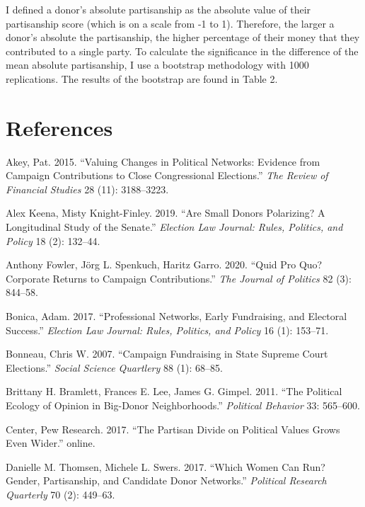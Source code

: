 \documentclass[11pt,]{article}
\begin{document}
I defined a donor's absolute partisanship as the absolute value of their
partisanship score (which is on a scale from -1 to 1). Therefore, the
larger a donor's absolute the partisanship, the higher percentage of
their money that they contributed to a single party. To calculate the
significance in the difference of the mean absolute partisanship, I use
a bootstrap methodology with 1000 replications. The results of the
bootstrap are found in Table 2.

\hypertarget{references}{%
\section*{References}\label{references}}

\hypertarget{refs}{}
\leavevmode\hypertarget{ref-akey2015}{}%
Akey, Pat. 2015. ``Valuing Changes in Political Networks: Evidence from
Campaign Contributions to Close Congressional Elections.'' \emph{The
Review of Financial Studies} 28 (11): 3188--3223.

\leavevmode\hypertarget{ref-keena2019}{}%
Alex Keena, Misty Knight-Finley. 2019. ``Are Small Donors Polarizing? A
Longitudinal Study of the Senate.'' \emph{Election Law Journal: Rules,
Politics, and Policy} 18 (2): 132--44.

\leavevmode\hypertarget{ref-garro2020}{}%
Anthony Fowler, Jörg L. Spenkuch, Haritz Garro. 2020. ``Quid Pro Quo?
Corporate Returns to Campaign Contributions.'' \emph{The Journal of
Politics} 82 (3): 844--58.

\leavevmode\hypertarget{ref-bonica2017}{}%
Bonica, Adam. 2017. ``Professional Networks, Early Fundraising, and
Electoral Success.'' \emph{Election Law Journal: Rules, Politics, and
Policy} 16 (1): 153--71.

\leavevmode\hypertarget{ref-bonneau2007}{}%
Bonneau, Chris W. 2007. ``Campaign Fundraising in State Supreme Court
Elections.'' \emph{Social Science Quartlery} 88 (1): 68--85.

\leavevmode\hypertarget{ref-bramlett2011}{}%
Brittany H. Bramlett, Frances E. Lee, James G. Gimpel. 2011. ``The
Political Ecology of Opinion in Big-Donor Neighborhoods.''
\emph{Political Behavior} 33: 565--600.

\leavevmode\hypertarget{ref-pew2017}{}%
Center, Pew Research. 2017. ``The Partisan Divide on Political Values
Grows Even Wider.'' online.

\leavevmode\hypertarget{ref-thomsen2017}{}%
Danielle M. Thomsen, Michele L. Swers. 2017. ``Which Women Can Run?
Gender, Partisanship, and Candidate Donor Networks.'' \emph{Political
Research Quarterly} 70 (2): 449--63.
\end{document}
